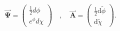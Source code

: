 \begin{equation}
\overset{\rightharpoonup }{\mathbf{\Psi }}=\left(
\begin{array}{c}
\frac{1}{2}d\phi  \\
e^{\phi }d\chi
\end{array}
\right)\quad,\quad \overset{\rightharpoonup }{\mathbf{A}}%
=\left(
\begin{array}{c}
\frac{1}{2}\text{d}\widetilde{\phi } \\
\text{d}\widetilde{\chi }
\end{array}
\right).
\end{equation}

